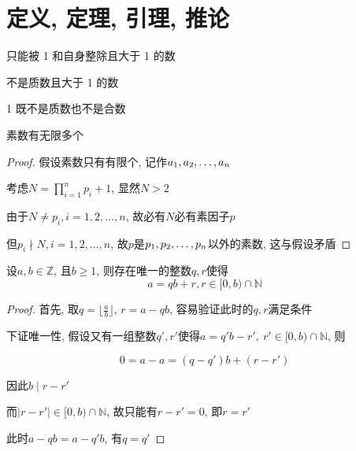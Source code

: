 \section{定义, 定理, 引理, 推论}

\begin{definition}[素数/质数]
    只能被 1 和自身整除且大于 1 的数
\end{definition}

\begin{definition}[合数]
    不是质数且大于 1 的数
\end{definition}

\begin{remark}
    1 既不是质数也不是合数
\end{remark}

\begin{theorem}
    \label{prime:infPrime}
    
    素数有无限多个
    
    \begin{proof}

        假设素数只有有限个,
        记作\(\def\enum#1{a_{ #1}}\enum{1},\enum{2},\dots,\enum{n}\)
        
        考虑\(N=\prod_{i=1}^np_i+1\), 显然\(N>2\)
        
        由于\(N\ne p_i,i=1,2,\dots,n\), 故必有\(N\)必有素因子\(p\)
        
        但\(p_i\nmid N,i=1,2,\dots,n\),
        故\(p\)是\(\def\enum#1{p_{ #1}}\enum{1},\enum{2},\dots,\enum{n}\)以外的素数,
        这与假设矛盾
        
    \end{proof}
\end{theorem}

\begin{lemma}[带余除法]
    \label{div:divWithRemaining}
    设\(a,b\in\mathbb{Z}\), 且\(b\geqslant1\), 则存在唯一的整数\(q,r\)使得
    \begin{equation}
        a=qb+r,r\in[0,b)\cap\mathbb{N}
    \end{equation}
    
    \begin{proof}
        首先, 取\(q=\lfloor\frac{a}{b}\rfloor\), \(r=a-qb\),
        容易验证此时的\(q,r\)满足条件
        
        下证唯一性, 假设又有一组整数\(q',r'\)使得\(a=q'b-r',~r'\in[0,b)\cap\mathbb{N}\),
        则
        
        \begin{equation}
            0=a-a=(q-q')b+(r-r')
        \end{equation}
        
        因此\(b\mid r-r'\)
        
        而\(|r-r'|\in[0,b)\cap\mathbb{N}\), 故只能有\(r-r'=0\), 即\(r=r'\)
        
        此时\(a-qb=a-q'b\), 有\(q=q'\)
        
    \end{proof}
    
\end{lemma}

